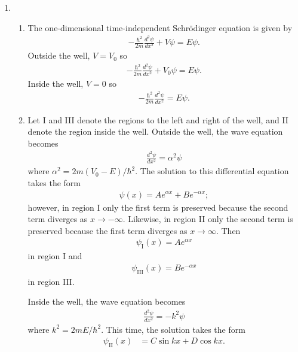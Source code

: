 \documentclass[a4paper,12pt]{article}
\begin{document}
\begin{enumerate}
    \item
        \begin{enumerate}
            \item
                The one-dimensional time-independent Schr\"odinger equation is given by
                \begin{align*}
                    -\frac{\hbar^2}{2m} \frac{d^2 \psi}{dx^2} + V \psi = E \psi.
                \end{align*}
                Outside the well, $V = V_0$ so
                \begin{align*}
                    -\frac{\hbar^2}{2m} \frac{d^2 \psi}{dx^2} + V_0 \psi = E \psi.
                \end{align*}
                Inside the well, $V = 0$ so
                \begin{align*}
                    -\frac{\hbar^2}{2m} \frac{d^2 \psi}{dx^2} = E \psi.
                \end{align*}

            \item
                Let I and III denote the regions to the left and right of the well, and II denote the region inside the well. Outside the well, the wave equation becomes
                \begin{align*}
                    \frac{d^2 \psi}{dx^2} = \alpha^2 \psi
                \end{align*}
                where $\alpha^2 = 2m(V_0 - E) / \hbar^2$. The solution to this differential equation takes the form
                \begin{align*}
                    \psi(x) = Ae^{\alpha x} + Be^{-\alpha x};
                \end{align*}
                however, in region I only the first term is preserved because the second term diverges as ${x \to {-\infty}}$. Likewise, in region II only the second term is preserved because the first term diverges as $x \to \infty$. Then
                \begin{align*}
                    \psi_\text{I}(x) = Ae^{\alpha x}
                \end{align*}
                in region I and
                \begin{align*}
                    \psi_\text{III}(x) = Be^{-\alpha x}
                \end{align*}
                in region III. \par
                Inside the well, the wave equation becomes
                \begin{align*}
                    \frac{d^2 \psi}{dx^2} = -k^2 \psi
                \end{align*}
                where $k^2 = 2mE / \hbar^2$. This time, the solution takes the form
                \begin{align*}
                    \psi_\text{II}(x) &= C\sin{kx} + D\cos{kx}.
                \end{align*}


\end{enumerate}
\end{enumerate}
\end{document}
